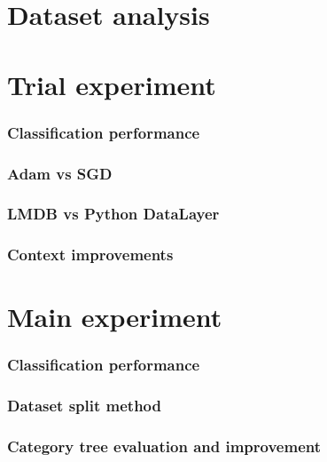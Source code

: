 \section{Dataset analysis}

\section{Trial experiment}
    \subsubsection{Classification performance}
    \subsubsection{Adam vs SGD}
    \subsubsection{LMDB vs Python DataLayer}
    \subsubsection{Context improvements}

\section{Main experiment}
    \subsubsection{Classification performance}
    \subsubsection{Dataset split method}
    \subsubsection{Category tree evaluation and improvement}
